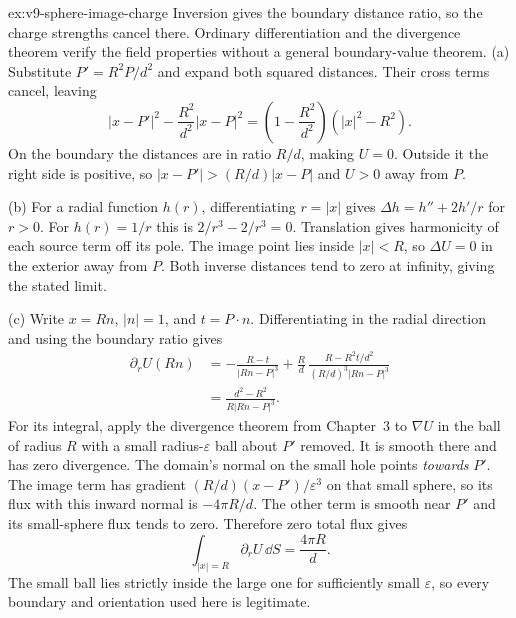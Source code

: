 \begin{solution}{ex:v9-sphere-image-charge}
\idea Inversion gives the boundary distance ratio, so the charge strengths cancel there. Ordinary differentiation and the divergence theorem verify the field properties without a general boundary-value theorem.
\writeup (a) Substitute $P'=R^2P/d^2$ and expand both squared distances. Their cross terms cancel, leaving
\[
|x-P'|^2-\frac{R^2}{d^2}|x-P|^2
=\left(1-\frac{R^2}{d^2}\right)(|x|^2-R^2).
\]
On the boundary the distances are in ratio $R/d$, making $U=0$. Outside it the right side is positive, so $|x-P'|>(R/d)|x-P|$ and $U>0$ away from $P$.

(b) For a radial function $h(r)$, differentiating $r=|x|$ gives $\Delta h=h''+2h'/r$ for $r>0$. For $h(r)=1/r$ this is $2/r^3-2/r^3=0$. Translation gives harmonicity of each source term off its pole. The image point lies inside $|x|<R$, so $\Delta U=0$ in the exterior away from $P$. Both inverse distances tend to zero at infinity, giving the stated limit.

(c) Write $x=Rn$, $|n|=1$, and $t=P\cdot n$. Differentiating in the radial direction and using the boundary ratio gives
\[
\begin{aligned}
\partial_rU(Rn)
&=-\frac{R-t}{|Rn-P|^3}
+\frac{R}{d}\,
\frac{R-R^2t/d^2}{(R/d)^3|Rn-P|^3}\\
&=\frac{d^2-R^2}{R|Rn-P|^3}.
\end{aligned}
\]
For its integral, apply the divergence theorem from Chapter~3 to $\nabla U$ in the ball of radius $R$ with a small radius-$\varepsilon$ ball about $P'$ removed. It is smooth there and has zero divergence. The domain's normal on the small hole points \emph{towards} $P'$. The image term has gradient $(R/d)(x-P')/\varepsilon^3$ on that small sphere, so its flux with this inward normal is $-4\pi R/d$. The other term is smooth near $P'$ and its small-sphere flux tends to zero. Therefore zero total flux gives
\[
\int_{|x|=R}\partial_rU\,\dd S=\frac{4\pi R}{d}.
\]
The small ball lies strictly inside the large one for sufficiently small $\varepsilon$, so every boundary and orientation used here is legitimate.
\end{solution}


